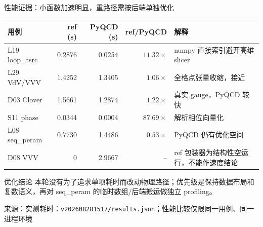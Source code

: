 \documentclass[UTF8,aspectratio=169,11pt]{ctexbeamer}
\newcommand{\source}[1]{\vspace{0.05em}\par{\raggedright\scriptsize\color{muted}来源：#1\par}}
\begin{document}
\begin{frame}[t]{性能证据：小函数加速明显，重路径需按后端单独优化}
  \small
  \begin{tabularx}{0.96\textwidth}{@{}lrrrY@{}}
    \toprule
    用例 & ref (s) & PyQCD (s) & ref/PyQCD & 解释\\
    \midrule
    L19 loop\_tsrc & 0.2876 & 0.0254 & $11.32\times$ & numpy 直接索引避开高维 slicer\\
    L29 VdV/VVV & 1.4252 & 1.3405 & $1.06\times$ & 全格点张量收缩，接近\\
    D03 Clover & 1.5661 & 1.2874 & $1.22\times$ & 真实 gauge，PyQCD 较快\\
    S11 phase & 0.0344 & 0.0004 & $87.69\times$ & 解析相位向量化\\
    L08 seq\_peram & 0.7730 & 1.4486 & $0.53\times$ & PyQCD 仍有优化空间\\
    D08 VVV & 0 & 2.9667 & -- & ref 包装器为结构性空运行，不能作速度结论\\
    \bottomrule
  \end{tabularx}
  \vfill
  \begin{block}{优化结论}
    本轮没有为了追求单项耗时而改动物理路径；优先级是保持数据布局和复数语义，再对 seq\_peram 的临时数组/后端搬运做独立 profiling。
  \end{block}
  \source{实测耗时：\texttt{v202608281517/results.json}；性能比较仅限同一用例、同一进程环境}
\end{frame}
\end{document}
